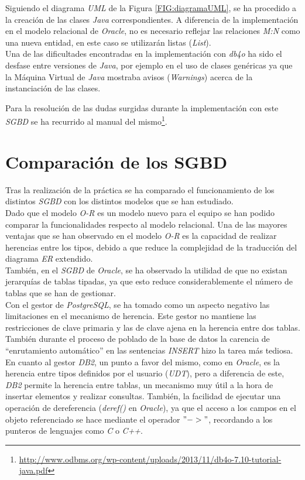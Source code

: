\documentclass{article}
\begin{document}
Siguiendo el diagrama \emph{UML} de la Figura \ref{FIG:diagramaUML}, se ha procedido a la creación de las clases \emph{Java} correspondientes. A diferencia de la implementación en el modelo relacional de \emph{Oracle}, no es necesario reflejar las relaciones \emph{M:N} como una nueva entidad, en este caso se utilizarán listas (\emph{List}).\\

Una de las dificultades encontradas en la implementación con \emph{db4o} ha sido el desfase entre versiones de \emph{Java}, por ejemplo en el uso de clases genéricas ya que la Máquina Virtual de \emph{Java} mostraba avisos (\emph{Warnings}) acerca de la instanciación de las clases.

Para la resolución de las dudas surgidas durante la implementación con este \emph{SGBD} se ha recurrido al manual del mismo\footnote{\url{http://www.odbms.org/wp-content/uploads/2013/11/db4o-7.10-tutorial-java.pdf}}.

\section{Comparación de los SGBD}

Tras la realización de la práctica se ha comparado el funcionamiento de los distintos \emph{SGBD} con los distintos modelos que se han estudiado.\\
Dado que el modelo \emph{O-R} es un modelo nuevo para el equipo se han podido comparar la funcionalidades respecto al modelo relacional. Una de las mayores ventajas que se han observado en el modelo \emph{O-R} es la capacidad de realizar herencias entre los tipos, debido a que reduce la complejidad de la traducción del diagrama \emph{ER} extendido.\\
También, en el \emph{SGBD} de \emph{Oracle}, se ha observado la utilidad de que no existan jerarquías de tablas tipadas, ya que esto reduce considerablemente el número de tablas que se han de gestionar.\\

Con el gestor de \emph{PostgreSQL}, se ha tomado como un aspecto negativo las limitaciones en el mecanismo de herencia. Este gestor no mantiene las restricciones de clave primaria y las de clave ajena en la herencia entre dos tablas. También durante el proceso de poblado de la base de datos la carencia de ``enrutamiento automático'' en las sentencias \emph{INSERT} hizo la tarea más tediosa.\\

En cuanto al gestor \emph{DB2}, un punto a favor del mismo, como en \emph{Oracle}, es la herencia entre tipos definidos por el usuario (\emph{UDT}), pero a diferencia de este, \emph{DB2} permite la herencia entre tablas, un mecanismo muy útil a la hora de insertar elementos y realizar consultas. También, la facilidad de ejecutar una operación de dereferencia (\emph{deref()} en \emph{Oracle}), ya que el acceso a los campos en el objeto referenciado se hace mediante el operador $"->"$, recordando a los punteros de lenguajes como \emph{C} o \emph{C++}.\\
\end{document}
